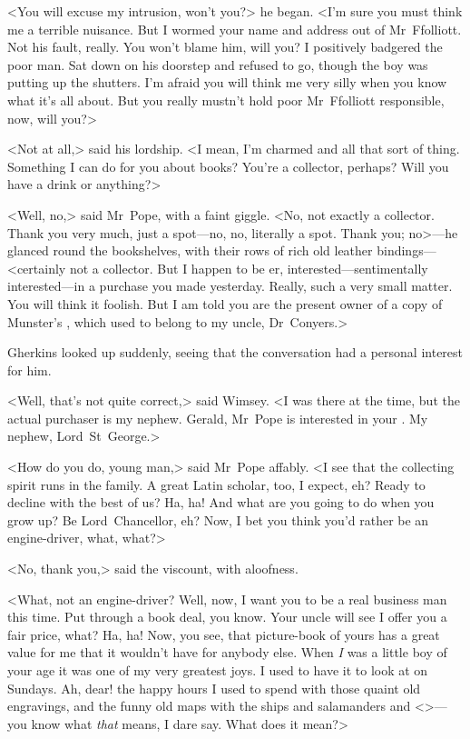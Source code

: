 <You will excuse my intrusion, won't you?> he began. <I'm sure you must think me a terrible nuisance. But I wormed your name and address out of Mr~Ffolliott. Not his fault, really. You won't blame him, will you? I positively badgered the poor man. Sat down on his doorstep and refused to go, though the boy was putting up the shutters. I'm afraid you will think me very silly when you know what it's all about. But you really mustn't hold poor Mr~Ffolliott responsible, now, will you?>

<Not at all,> said his lordship. <I mean, I'm charmed and all that sort of thing. Something I can do for you about books? You're a collector, perhaps? Will you have a drink or anything?>

<Well, no,> said Mr~Pope, with a faint giggle. <No, not exactly a collector. Thank you very much, just a spot—no, no, literally a spot. Thank you; no>—he glanced round the bookshelves, with their rows of rich old leather bindings—<certainly not a collector. But I happen to be er, interested—sentimentally interested—in a purchase you made yesterday. Really, such a very small matter. You will think it foolish. But I am told you are the present owner of a copy of Munster's , which used to belong to my uncle, Dr~Conyers.>

Gherkins looked up suddenly, seeing that the conversation had a personal interest for him.

<Well, that's not quite correct,> said Wimsey. <I was there at the time, but the actual purchaser is my nephew. Gerald, Mr~Pope is interested in your . My nephew, Lord~St~George.>

<How do you do, young man,> said Mr~Pope affably. <I see that the collecting spirit runs in the family. A great Latin scholar, too, I expect, eh? Ready to decline  with the best of us? Ha, ha! And what are you going to do when you grow up? Be Lord~Chancellor, eh? Now, I bet you think you'd rather be an engine-driver, what, what?>

<No, thank you,> said the viscount, with aloofness.

<What, not an engine-driver? Well, now, I want you to be a real business man this time. Put through a book deal, you know. Your uncle will see I offer you a fair price, what? Ha, ha! Now, you see, that picture-book of yours has a great value for me that it wouldn't have for anybody else. When \emph{I} was a little boy of your age it was one of my very greatest joys. I used to have it to look at on Sundays. Ah, dear! the happy hours I used to spend with those quaint old engravings, and the funny old maps with the ships and salamanders and <>—you know what \emph{that} means, I dare say. What does it mean?>

